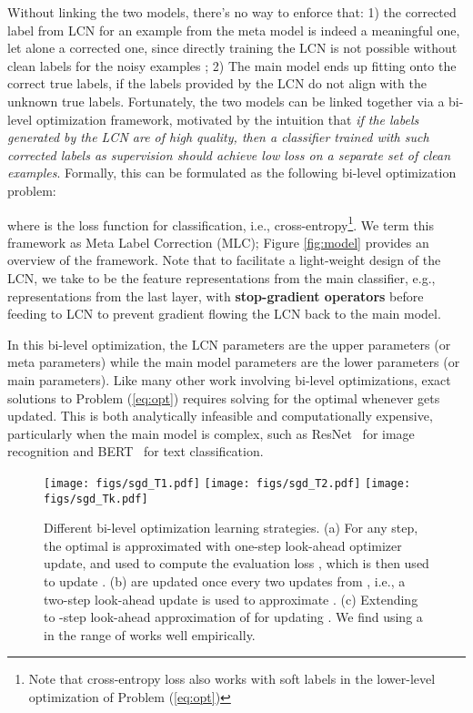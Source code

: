 Without linking the two models, there's no way to enforce that: 1) the
corrected label from LCN for an example from the meta model  is
indeed a meaningful one, let alone a corrected one, since directly
training the LCN is not possible without clean labels for the noisy
examples ; 2) The main model  ends up fitting onto the correct true
labels, if the labels provided by the LCN do not align with the
unknown true labels. Fortunately, the two models can be linked
together via a bi-level optimization framework, motivated by the
intuition that \textit{if the labels generated by the LCN are of high
  quality, then a classifier trained with such corrected labels as
  supervision should achieve low loss on a separate set of clean
  examples}. Formally, this can be formulated as the following bi-level optimization problem:

where  is the loss function for classification, i.e.,
cross-entropy\footnote{Note that cross-entropy loss also works with
  soft labels in the lower-level optimization of Problem
  (\ref{eq:opt})}. We term this framework as Meta Label Correction
(MLC); Figure \ref{fig:model} provides an overview of the
framework. Note that to facilitate a light-weight design of the LCN,
we take  to be the feature representations from the main
classifier, e.g., representations from the last layer, with
\textbf{stop-gradient operators} before feeding to LCN to prevent
gradient flowing the LCN back to the main model.

In this bi-level optimization, the LCN parameters  are
the upper parameters (or meta parameters) while the main model
parameters  are the lower parameters (or main
parameters). Like many other work involving bi-level optimizations,
exact solutions to Problem (\ref{eq:opt}) requires solving for the
optimal  whenever  gets updated. This is
 both analytically infeasible and computationally expensive,
particularly when the main model  is complex, such as
ResNet~\cite{he2016deep} for image recognition and
BERT~\cite{devlin2018bert} for text classification.

\begin{figure}[t]
  \centering \texttt{[image: figs/sgd\_T1.pdf]}
  \hfill
  \texttt{[image: figs/sgd\_T2.pdf]}
  \hfill
  \texttt{[image: figs/sgd\_Tk.pdf]}
\caption{Different bi-level optimization learning strategies.  (a) For any step, the optimal  is approximated with one-step look-ahead
    optimizer update, and used to compute the
    evaluation loss , which is then used to update .  (b)  are updated once every two updates from , i.e., a two-step look-ahead update is
    used to approximate . (c) Extending to -step look-ahead approximation of
     for updating .
We find
    using a  in the range of  works well empirically.}
  \label{fig:sgdT}
\end{figure}


